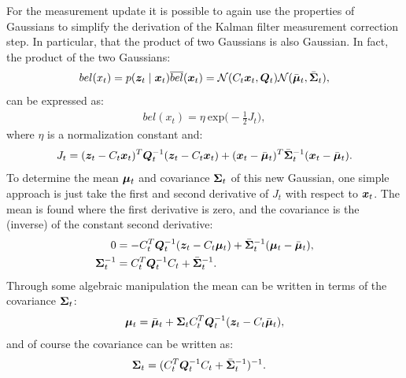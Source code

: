 For the measurement update it is possible to again use the properties of Gaussians to simplify the derivation of the Kalman filter measurement correction step. In particular, that the product of two Gaussians is also Gaussian. In fact, the product of the two Gaussians:
\begin{equation*}
\begin{split}
bel(x_t) = p(\bm{z}_t \mid \bm{x}_t)\overline{bel}(\bm{x}_t) &= \mathcal{N}(C_t\bm{x}_t,\bm{Q}_t) \mathcal{N}(\bar{\bm{\mu}}_{t},\bar{\bm{\Sigma}}_{t}), \\
\end{split}
\end{equation*}
can be expressed as:
\begin{equation*}
\begin{split}
bel(x_t) = \eta\: \text{exp}\big(-\frac{1}2 J_t \big),
\end{split}
\end{equation*}
where $\eta$ is a normalization constant and:
\begin{equation*}
    J_t = (\bm{z}_t-C_t\bm{x}_t)^T \bm{Q}_t^{-1} (\bm{z}_t-C_t\bm{x}_t) + (\bm{x}_t-\bar{\bm{\mu}}_t)^T \bar{\bm{\Sigma}}_t^{-1} (\bm{x}_t-\bar{\bm{\mu}}_t).
\end{equation*}
To determine the mean $\bm{\mu}_t$ and covariance $\bm{\Sigma}_t$ of this new Gaussian, one simple approach is just take the first and second derivative of $J_t$ with respect to $\bm{x}_t$. The mean is found where the first derivative is zero, and the covariance is the (inverse) of the constant second derivative:
\begin{equation*}
\begin{split}
0 &= -C_t^T \bm{Q}_t^{-1}(\bm{z}_t - C_t \bm{\mu}_t) + \bar{\bm{\Sigma}}_t^{-1}(\bm{\mu}_t - \bar{\bm{\mu}}_t), \\   
\bm{\Sigma}_t^{-1} &= C_t^T \bm{Q}_t^{-1} C_t + \bar{\bm{\Sigma}}_t^{-1}.
\end{split}
\end{equation*}
Through some algebraic manipulation the mean can be written in terms of the covariance $\bm{\Sigma}_t$:
\begin{equation*}
\begin{split}
\bm{\mu}_t &= \bar{\bm{\mu}}_t + \bm{\Sigma}_t C_t^T \bm{Q}_t^{-1}(\bm{z}_t - C_t \bar{\bm{\mu}}_t), \\
\end{split}
\end{equation*}
and of course the covariance can be written as:
\begin{equation*}
\begin{split}
\bm{\Sigma}_t &= (C_t^T \bm{Q}_t^{-1} C_t + \bar{\bm{\Sigma}}_t^{-1})^{-1}.
\end{split}
\end{equation*}
